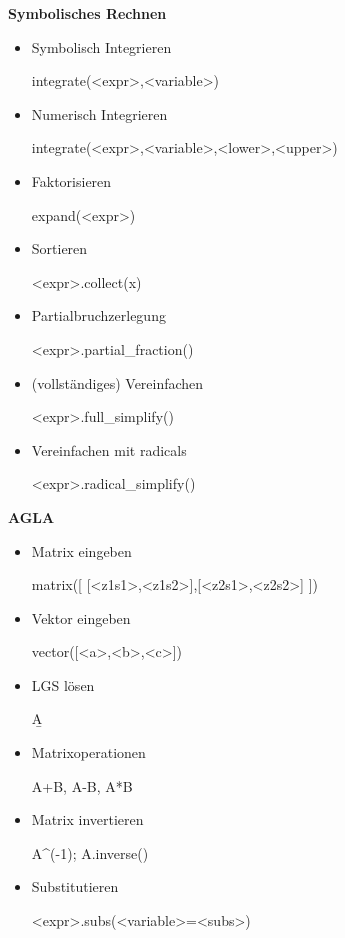 \documentclass[a4paper,9pt,DIV15,twocolumn]{scrartcl}
\begin{document}
\textbf{Symbolisches Rechnen}
\begin{itemize}
\item Symbolisch Integrieren
\begin{sagein}
integrate(<expr>,<variable>)
\end{sagein}
 \item Numerisch Integrieren 
\begin{sagein}
integrate(<expr>,<variable>,<lower>,<upper>)
\end{sagein}
\item Faktorisieren 
\begin{sagein}
expand(<expr>)
\end{sagein}
\item Sortieren 
\begin{sagein}
<expr>.collect(x)
\end{sagein}
\item Partialbruchzerlegung 
\begin{sagein}
<expr>.partial_fraction()
\end{sagein}
\item (vollständiges) Vereinfachen 
\begin{sagein}
<expr>.full_simplify()
\end{sagein}
\item Vereinfachen mit radicals 
\begin{sagein}
<expr>.radical_simplify()
\end{sagein}
\end{itemize}

\textbf{AGLA}
\begin{itemize}
\item Matrix eingeben 
\begin{sagein}
matrix([ [<z1s1>,<z1s2>],[<z2s1>,<z2s2>] ])
\end{sagein}
 \item Vektor eingeben 
\begin{sagein}
vector([<a>,<b>,<c>])
\end{sagein}
\item LGS lösen 
\begin{sagein}
A\b
\end{sagein}
\item Matrixoperationen 
\begin{sagein}
A+B, A-B, A*B
\end{sagein}
\item Matrix invertieren 
\begin{sagein}
A^(-1); A.inverse()
\end{sagein}
\item Substitutieren 
\begin{sagein}
<expr>.subs(<variable>=<subs>)
\end{sagein}
\end{itemize}
\end{document}
